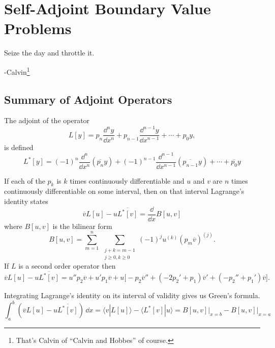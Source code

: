 \flushbottom





\chapter{Self-Adjoint Boundary Value Problems}



Seize the day and throttle it.

\begin{flushright}
  -Calvin\footnote{That's Calvin of ``Calvin and Hobbes'' of course.}
\end{flushright}







\section{Summary of Adjoint Operators}

The adjoint of the operator
\[ 
L[y] = p_n \frac{\dd^n y}{\dd x^n} + p_{n-1} \frac{\dd^{n-1} y}{\dd x^{n-1}} + \cdots + p_0 y,
\]
is defined
\[ 
L^*[y] = (-1)^n \frac{\dd^n}{\dd x^n} (\overline{p_n} y) + (-1)^{n-1}
\frac{\dd^{n-1}}{\dd x^{n-1}}(\overline{p_{n-1}} y) + \cdots + \overline{p_0} y 
\]

If each of the $p_k$ is $k$ times continuously differentiable and $u$ and 
$v$ are $n$ times continuously differentiable on some interval, then on that
interval Lagrange's identity states
\[ \overline{v}L[u] - u \overline{L^*[v]} = \frac{\dd}{\dd x} B[u,v] \]
where $B[u,v]$ is the bilinear form
\[ B[u,v] = \sum_{m=1}^n \ \sum_{\substack{ j+k=m-1 \\ j\geq 0, k \geq 0 }}
(-1)^j u^{(k)} (p_m \overline{v})^{(j)}.\]
If $L$ is a second order operator then
\[ \overline{v} L[u] - u \overline{L^*[v]} = u'' p_2 \overline{v} + u' p_1 \overline{v} 
+ u \big[-p_2 \overline{v}'' + (-2 p_2' + p_1)
\overline{v}' + (-p_2'' + p_1')\overline{v}\big]. \]

Integrating Lagrange's identity on its interval of validity
gives us Green's formula.
\[ \int_a^b \left( \overline{v} L[u] - u \overline{L^*[v]} \right)\,\dd x =
\langle v | L[u] \rangle - \langle L^*[v] | u\rangle = 
B[u,v] \big|_{x=b} - B[u,v] \big|_{x=a} \]















